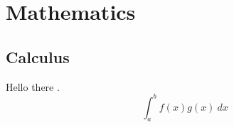 \chapter{Mathematics}
\section{Calculus}

Hello there \cite{hubbard_hubbard}.
$$\int_a^b f(x)g(x) \ dx$$

